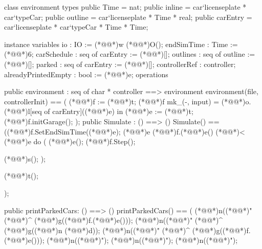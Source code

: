 \documentclass[a4paper]{article}
\begin{document}
\title{}
\author{}
\begin{vdm_al}
class environment
types
    public Time = nat;
    public inline = car`licenseplate * car`typeCar;
    public outline = car`licenseplate * Time * real;
    public carEntry = car`licenseplate * car`typeCar * Time * Time;


instance variables
    io : IO := (*@@*)w (*@@*)O();
    endSimTime : Time := (*@@*)6;
    carSchedule : seq of carEntry := (*@\vdmnotcovered{}@*)[];
    outlines : seq of outline := (*@\vdmnotcovered{}@*)[];
    parked : seq of carEntry := (*@\vdmnotcovered{}@*)[];
    controllerRef : controller;
    alreadyPrintedEmpty : bool := (*@@*)e;
operations

public environment : seq of char * controller ==> environment
environment(file, controllerInit) ==
(
    (*@@*)f := (*@@*)t;
    (*@@*)f mk_(-, input) = (*@@*)o.(*@@*)l[seq of carEntry]((*@@*)e) 
    in
        (*@@*)e := (*@@*)t;
    (*@@*)f.initGarage();
);
public Simulate : () ==> ()
    Simulate() ==
    ((*@@*)f.SetEndSimTime((*@@*)e);
    (*@@*)e (*@@*)f.(*@@*)e() (*@\vdmnotcovered{}@*)< (*@@*)e do
    (
        (*@@*)e();
        (*@@*)f.Step();
        
        (*@@*)s();
    );

    (*@@*)t();
    
    );

public printParkedCars: () ==> ()
printParkedCars() ==
(
    (*@@*)n((*@@*)" (*@\vdmnotcovered{}@*)^ (*@@*)g((*@@*)f.(*@@*)e()));
    (*@@*)n((*@@*)" (*@\vdmnotcovered{}@*)^ (*@@*)g((*@@*)n (*@@*)d));
    (*@@*)n((*@@*)" (*@\vdmnotcovered{}@*)^ (*@@*)g((*@@*)f.(*@@*)e()));
    (*@@*)n((*@@*)");
    (*@@*)n((*@@*)");
    (*@@*)n((*@@*)");
    

\end{vdm_al}
\end{document}
